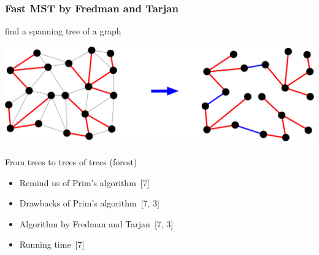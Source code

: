 \documentclass[titlepage,german,presentation]{beamer}
\begin{document}
\begin{frame}
\frametitle{Fast MST by Fredman and Tarjan}

\begin{block}
  find a spanning tree of a graph 
\end{block}

\begin{center}
\includegraphics[height=0.2\textwidth]{FredmanTarjan}\\
~\\
From trees to trees of trees (forest)
\end{center}

\begin{itemize}
\item Remind us of Prim's algorithm~[7]
\medskip
\item Drawbacks of Prim's algorithm~[7, 3]
\medskip
\item Algorithm by Fredman and Tarjan~[7, 3]
\medskip
\item Running time~[7]
\end{itemize}

\end{frame}
\end{document}
